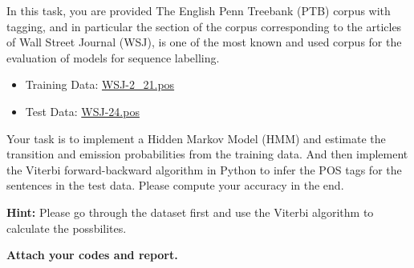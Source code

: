 \documentclass{article}
\begin{document}
In this task, you are provided The English Penn Treebank (PTB) corpus with tagging, 
and in particular the section of the corpus corresponding 
to the articles of Wall Street Journal (WSJ), 
is one of the most known and used corpus for the evaluation of models for sequence labelling.

\begin{itemize}
    \item Training Data: \href{https://drive.google.com/file/d/16H4D4nsntZVA4sXslWAy2nl8BX_gxofM/view?usp=sharing}{WSJ-2\_21.pos}
    \item Test Data: \href{https://drive.google.com/file/d/1yl_ea9VznZuauavGMLfLHxzcZf2yPil3/view?usp=sharing}{WSJ-24.pos}
\end{itemize}

Your task is to implement a Hidden Markov Model (HMM) and 
estimate the transition and emission probabilities from the training data.
And then implement the Viterbi forward-backward algorithm in Python
to infer the POS tags for the sentences in the test data. Please
compute your accuracy in the end. 

\textbf{Hint:} Please go through the dataset first and use the Viterbi algorithm to calculate the possbilites.

\textbf{Attach your codes and report.}

\vspace{0.8em}
\end{document}
